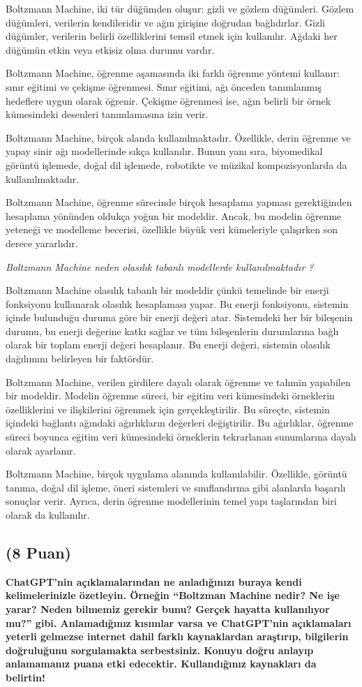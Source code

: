 \documentclass[11pt]{article}
\begin{document}
Boltzmann Machine, iki tür düğümden oluşur: gizli ve gözlem düğümleri. Gözlem düğümleri, verilerin kendileridir ve ağın girişine doğrudan bağlıdırlar. Gizli düğümler, verilerin belirli özelliklerini temsil etmek için kullanılır. Ağdaki her düğümün etkin veya etkisiz olma durumu vardır.

Boltzmann Machine, öğrenme aşamasında iki farklı öğrenme yöntemi kullanır: sınır eğitimi ve çekişme öğrenmesi. Sınır eğitimi, ağı önceden tanımlanmış hedeflere uygun olarak öğrenir. Çekişme öğrenmesi ise, ağın belirli bir örnek kümesindeki desenleri tanımlamasına izin verir.

Boltzmann Machine, birçok alanda kullanılmaktadır. Özellikle, derin öğrenme ve yapay sinir ağı modellerinde sıkça kullanılır. Bunun yanı sıra, biyomedikal görüntü işlemede, doğal dil işlemede, robotikte ve müzikal kompozisyonlarda da kullanılmaktadır.

Boltzmann Machine, öğrenme sürecinde birçok hesaplama yapması gerektiğinden hesaplama yönünden oldukça yoğun bir modeldir. Ancak, bu modelin öğrenme yeteneği ve modelleme becerisi, özellikle büyük veri kümeleriyle çalışırken son derece yararlıdır.

\textit{Boltzmann Machine neden olasılık tabanlı modellerde kullanılmaktadır ?}

Boltzmann Machine olasılık tabanlı bir modeldir çünkü temelinde bir enerji fonksiyonu kullanarak olasılık hesaplaması yapar. Bu enerji fonksiyonu, sistemin içinde bulunduğu duruma göre bir enerji değeri atar. Sistemdeki her bir bileşenin durumu, bu enerji değerine katkı sağlar ve tüm bileşenlerin durumlarına bağlı olarak bir toplam enerji değeri hesaplanır. Bu enerji değeri, sistemin olasılık dağılımını belirleyen bir faktördür.

Boltzmann Machine, verilen girdilere dayalı olarak öğrenme ve tahmin yapabilen bir modeldir. Modelin öğrenme süreci, bir eğitim veri kümesindeki örneklerin özelliklerini ve ilişkilerini öğrenmek için gerçekleştirilir. Bu süreçte, sistemin içindeki bağlantı ağındaki ağırlıkların değerleri değiştirilir. Bu ağırlıklar, öğrenme süreci boyunca eğitim veri kümesindeki örneklerin tekrarlanan sunumlarına dayalı olarak ayarlanır.

Boltzmann Machine, birçok uygulama alanında kullanılabilir. Özellikle, görüntü tanıma, doğal dil işleme, öneri sistemleri ve sınıflandırma gibi alanlarda başarılı sonuçlar verir. Ayrıca, derin öğrenme modellerinin temel yapı taşlarından biri olarak da kullanılır.


\subsection{(8 Puan)} \textbf{ChatGPT’nin açıklamalarından ne anladığınızı buraya kendi kelimelerinizle özetleyin. Örneğin ``Boltzman Machine nedir? Ne işe yarar? Neden bilmemiz gerekir bunu? Gerçek hayatta kullanılıyor mu?'' gibi. Anlamadığınız kısımlar varsa ve ChatGPT’nin açıklamaları yeterli gelmezse internet dahil farklı kaynaklardan araştırıp, bilgilerin doğruluğunu sorgulamakta serbestsiniz. Konuyu doğru anlayıp anlamamanız puana etki edecektir. Kullandığınız kaynakları da belirtin!}
\end{document}

